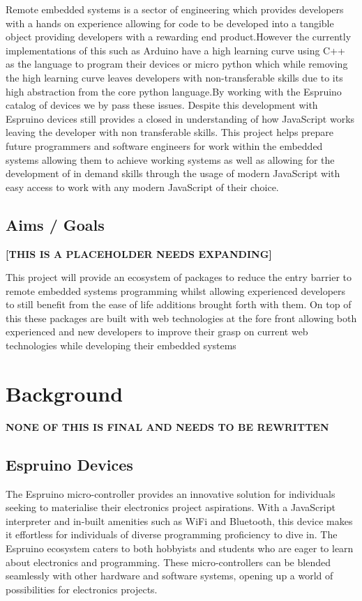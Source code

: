 \documentclass{l4proj}
\begin{document}
\text Remote embedded systems is a sector of engineering which provides developers with a hands on experience allowing for code to be developed into a tangible object providing developers with a rewarding end product.However  the  currently  implementations  of  this  such  as  Arduino  have  a  high  learning  curve  using  C++ as the language to program their devices or micro python which while removing the high learning curve leaves developers with non-transferable skills due to its high abstraction from the core python language.By working with the Espruino catalog of devices we by pass these issues.  Despite this development with Espruino devices still provides a closed in understanding of how JavaScript works leaving the developer with  non  transferable  skills.   This  project  helps  prepare  future  programmers  and  software  engineers  for work within the embedded systems allowing them to achieve working systems as well as allowing for the development of in demand skills through the usage of modern JavaScript with easy access to work with any modern JavaScript of their choice.

\section{Aims / Goals}

\textbf{[THIS IS A PLACEHOLDER NEEDS EXPANDING]}

\text This project will provide an ecosystem of packages to reduce the entry barrier to remote embedded systems programming whilst allowing experienced developers to still benefit from the ease of life additions brought forth with them.  On top of this these packages are built with web technologies at the fore front allowing both experienced and new developers to improve their grasp on current web technologies while developing their embedded systems



\chapter{Background}

\textbf{NONE OF THIS IS FINAL AND NEEDS TO BE REWRITTEN}

\section{Espruino Devices}
\text 
The Espruino micro-controller provides an innovative solution for individuals seeking to materialise their electronics project aspirations. With a JavaScript interpreter and in-built amenities such as WiFi and Bluetooth, this device makes it effortless for individuals of diverse programming proficiency to dive in. The Espruino ecosystem caters to both hobbyists and students who are eager to learn about electronics and programming. These micro-controllers can be blended seamlessly with other hardware and software systems, opening up a world of possibilities for electronics projects.
    
\end{document}
